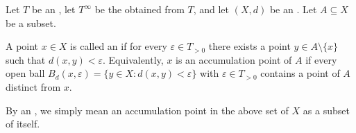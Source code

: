 \begin{definition} \label{definition:accumulation_point_in_an_extended_metric_space}
    Let $T$ be an , let $T^\infty$ be the  obtained from $T$, and let $(X,d)$ be an . Let $A \subseteq X$ be a subset.

    A point $x \in X$ is called an  if for every $\varepsilon \in T_{>0}$ there exists a point $y \in A \setminus \{x\}$ such that $d(x,y) < \varepsilon$.
    Equivalently, $x$ is an accumulation point of $A$ if every open ball $B_d(x,\varepsilon) = \{y \in X : d(x,y) < \varepsilon\}$ with $\varepsilon \in T_{>0}$ contains a point of $A$ distinct from $x$.

    By an , we simply mean an accumulation point in the above set of $X$ as a subset of itself.
\end{definition}